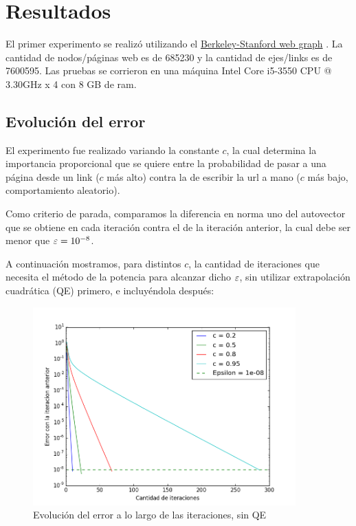\section{Resultados}

El primer experimento se realiz\'o utilizando el \href{http://snap.stanford.edu/data/web-BerkStan.html}{Berkeley-Stanford web graph} . La cantidad de nodos/p\'aginas web es de 685230 y la cantidad de ejes/links es de 7600595.
Las pruebas se corrieron en una máquina Intel Core i5-3550 CPU @ 3.30GHz x 4 con 8 GB de ram. 

\subsection{Evolución del error}

El experimento fue realizado variando la constante $c$, la cual determina la importancia proporcional que se quiere
entre la probabilidad de pasar a una p\'agina desde un link ($c$ más alto) contra la de escribir la url a mano ($c$ más bajo, comportamiento aleatorio).

Como criterio de parada, comparamos la diferencia en norma uno del autovector que se obtiene
en cada iteraci\'on contra el de la iteraci\'on anterior, la cual debe ser menor que $\varepsilon = 10^{-8}$.

A continuación mostramos, para distintos $c$, la cantidad de iteraciones que necesita el método de la potencia para alcanzar dicho $\varepsilon$, sin utilizar extrapolaci\'on cuadr\'atica (QE) primero, e incluy\'endola despu\'es:

\begin{figure}[H]
  \centering
    \includegraphics[width=0.9\textwidth]{errorSinQE.png}
    \caption{Evolución del error a lo largo de las iteraciones, sin QE}
    \label{}
\end{figure}

